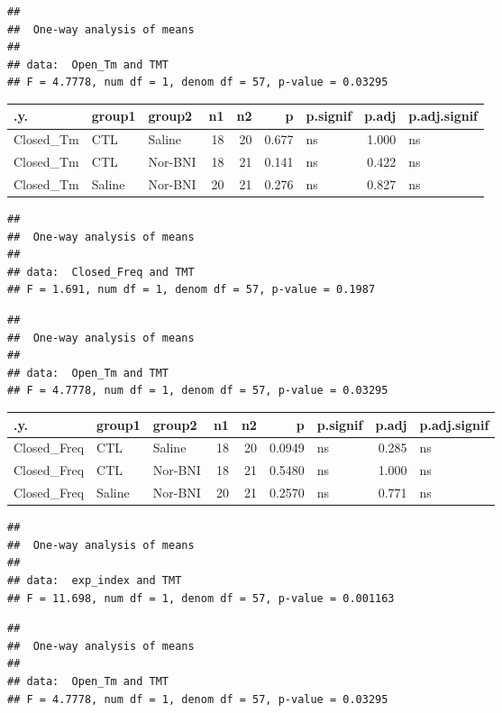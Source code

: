 \documentclass[
]{book}
\begin{document}
\begin{verbatim}
## 
##  One-way analysis of means
## 
## data:  Open_Tm and TMT
## F = 4.7778, num df = 1, denom df = 57, p-value = 0.03295
\end{verbatim}

\begin{tabular}{l|l|l|r|r|r|l|r|l}
\hline
.y. & group1 & group2 & n1 & n2 & p & p.signif & p.adj & p.adj.signif\\
\hline
Closed\_Tm & CTL & Saline & 18 & 20 & 0.677 & ns & 1.000 & ns\\
\hline
Closed\_Tm & CTL & Nor-BNI & 18 & 21 & 0.141 & ns & 0.422 & ns\\
\hline
Closed\_Tm & Saline & Nor-BNI & 20 & 21 & 0.276 & ns & 0.827 & ns\\
\hline
\end{tabular}

\begin{verbatim}
## 
##  One-way analysis of means
## 
## data:  Closed_Freq and TMT
## F = 1.691, num df = 1, denom df = 57, p-value = 0.1987
\end{verbatim}

\begin{verbatim}
## 
##  One-way analysis of means
## 
## data:  Open_Tm and TMT
## F = 4.7778, num df = 1, denom df = 57, p-value = 0.03295
\end{verbatim}

\begin{tabular}{l|l|l|r|r|r|l|r|l}
\hline
.y. & group1 & group2 & n1 & n2 & p & p.signif & p.adj & p.adj.signif\\
\hline
Closed\_Freq & CTL & Saline & 18 & 20 & 0.0949 & ns & 0.285 & ns\\
\hline
Closed\_Freq & CTL & Nor-BNI & 18 & 21 & 0.5480 & ns & 1.000 & ns\\
\hline
Closed\_Freq & Saline & Nor-BNI & 20 & 21 & 0.2570 & ns & 0.771 & ns\\
\hline
\end{tabular}

\begin{verbatim}
## 
##  One-way analysis of means
## 
## data:  exp_index and TMT
## F = 11.698, num df = 1, denom df = 57, p-value = 0.001163
\end{verbatim}

\begin{verbatim}
## 
##  One-way analysis of means
## 
## data:  Open_Tm and TMT
## F = 4.7778, num df = 1, denom df = 57, p-value = 0.03295
\end{verbatim}
\end{document}
